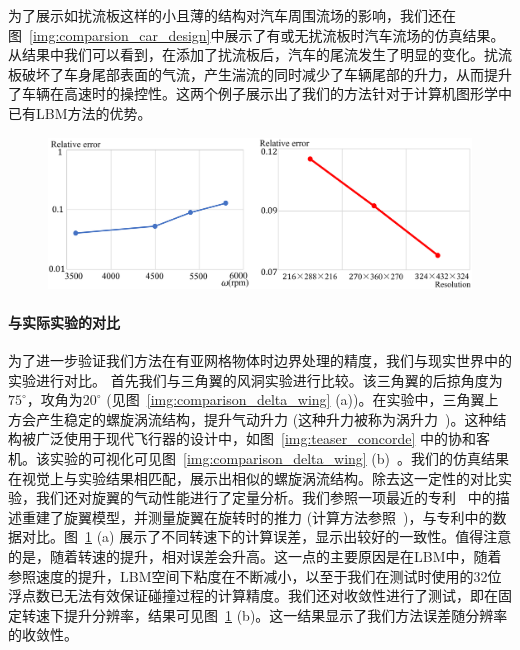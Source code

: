 为了展示如扰流板这样的小且薄的结构对汽车周围流场的影响，我们还在图~\ref{img:comparsion_car_design}中展示了有或无扰流板时汽车流场的仿真结果。从结果中我们可以看到，在添加了扰流板后，汽车的尾流发生了明显的变化。扰流板破坏了车身尾部表面的气流，产生湍流的同时减少了车辆尾部的升力，从而提升了车辆在高速时的操控性。这两个例子展示出了我们的方法针对于计算机图形学中已有LBM方法的优势。

\begin{figure}[!htbp]
  \centering
    \includegraphics[width=0.99\columnwidth]{figures/DJI_compare.png}
  \label{img:DJI_thrust_compare}
\end{figure}

\paragraph{与实际实验的对比}
为了进一步验证我们方法在有亚网格物体时边界处理的精度，我们与现实世界中的实验进行对比。
首先我们与三角翼的风洞实验进行比较。该三角翼的后掠角度为$75^\circ$，攻角为$20^\circ$ (见图~\ref{img:comparison_delta_wing} (a))。在实验中，三角翼上方会产生稳定的螺旋涡流结构，提升气动升力 (这种升力被称为涡升力~\cite{anderson2010aircraft})。这种结构被广泛使用于现代飞行器的设计中，如图~\ref{img:teaser_concorde} 中的协和客机。该实验的可视化可见图~\ref{img:comparison_delta_wing} (b)~\cite{Delery:2001}。我们的仿真结果在视觉上与实验结果相匹配，展示出相似的螺旋涡流结构。除去这一定性的对比实验，我们还对旋翼的气动性能进行了定量分析。我们参照一项最近的专利~\cite{lin2020screw} 中的描述重建了旋翼模型，并测量旋翼在旋转时的推力 (计算方法参照~\cite{leishman_2016})，与专利中的数据对比。图~\ref{img:DJI_thrust_compare} (a) 展示了不同转速下的计算误差，显示出较好的一致性。值得注意的是，随着转速的提升，相对误差会升高。这一点的主要原因是在LBM中，随着参照速度的提升，LBM空间下粘度在不断减小，以至于我们在测试时使用的32位浮点数已无法有效保证碰撞过程的计算精度。我们还对收敛性进行了测试，即在固定转速下提升分辨率，结果可见图~\ref{img:DJI_thrust_compare} (b)。这一结果显示了我们方法误差随分辨率的收敛性。

